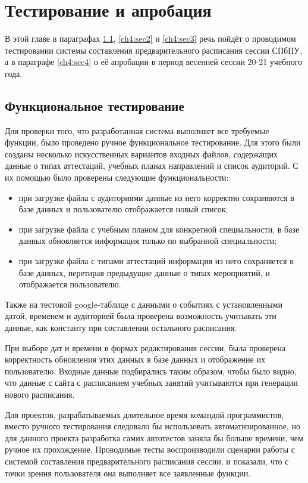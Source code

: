 \chapter{Тестирование и апробация} \label{ch4}

В этой главе в параграфах \ref{ch4:sec1}, \ref{ch4:sec2} и \ref{ch4:sec3} речь пойдёт о проводимом тестировании системы составления предварительного расписания сессии СПбПУ, а в параграфе \ref{ch4:sec4} о её апробации в период весенней сессии 20-21 учебного года.

\section{Функциональное тестирование} \label{ch4:sec1}
Для проверки того, что разработанная система выполняет все требуемые функции, было проведено ручное функциональное тестирование. Для этого были созданы несколько искусственных вариантов входных файлов, содержащих данные о типах аттестаций, учебных планах направлений и список аудиторий. С их помощью было проверены следующие функциональности:
\begin{itemize}
	\item при загрузке файла с аудиториями данные из него корректно сохраняются в базе данных и пользователю отображается новый список;
	\item при загрузке файла с учебным планом для конкретной специальности, в базе данных обновляется информация только по выбранной специальности;
	\item при загрузке файла с типами аттестаций информация из него сохраняется в базе данных, перетирая предыдущие данные о типах мероприятий, и отображается пользователю.
\end{itemize} 	

Также на тестовой google-таблице с данными о событиях с установленными датой, временем и аудиторией была проверена возможность учитывать эти данные, как константу при составлении остального расписания.

При выборе дат и времени в формах редактирования сессии, была проверена корректность обновления этих данных в базе данных и отображение их пользователю. Входные данные подбирались таким образом, чтобы было видно, что данные с сайта с расписанием учебных занятий \cite{ruz} учитываются при генерации нового расписания.

Для проектов, разрабатываемых длительное время командой программистов, вместо ручного тестирования следовало бы использовать автоматизированное, но для данного проекта разработка самих автотестов заняла бы больше времени, чем ручное их прохождение. Проводимые тесты воспроизводили сценарии работы с системой составления предварительного расписания сессии, и показали, что с точки зрения пользователя она выполняет все заявленные функции.

